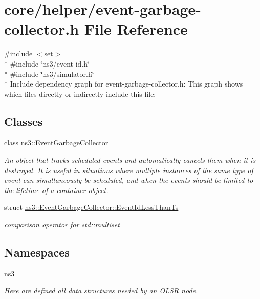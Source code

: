 \hypertarget{event-garbage-collector_8h}{}\section{core/helper/event-\/garbage-\/collector.h File Reference}
\label{event-garbage-collector_8h}
{\ttfamily \#include $<$set$>$}\\*
{\ttfamily \#include \char`\"{}ns3/event-\/id.\+h\char`\"{}}\\*
{\ttfamily \#include \char`\"{}ns3/simulator.\+h\char`\"{}}\\*
Include dependency graph for event-\/garbage-\/collector.h\+:
This graph shows which files directly or indirectly include this file\+:
\subsection*{Classes}
\begin{DoxyCompactItemize}
\item 
class \hyperlink{classns3_1_1EventGarbageCollector}{ns3\+::\+Event\+Garbage\+Collector}
\begin{DoxyCompactList}\small\item\em An object that tracks scheduled events and automatically cancels them when it is destroyed. It is useful in situations where multiple instances of the same type of event can simultaneously be scheduled, and when the events should be limited to the lifetime of a container object. \end{DoxyCompactList}\item 
struct \hyperlink{structns3_1_1EventGarbageCollector_1_1EventIdLessThanTs}{ns3\+::\+Event\+Garbage\+Collector\+::\+Event\+Id\+Less\+Than\+Ts}
\begin{DoxyCompactList}\small\item\em comparison operator for std\+::multiset \end{DoxyCompactList}\end{DoxyCompactItemize}
\subsection*{Namespaces}
\begin{DoxyCompactItemize}
\item 
 \hyperlink{namespacens3}{ns3}
\begin{DoxyCompactList}\small\item\em Here are defined all data structures needed by an O\+L\+SR node. \end{DoxyCompactList}\end{DoxyCompactItemize}
